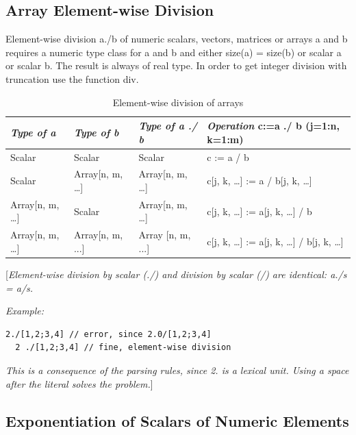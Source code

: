 \documentclass[10pt,a4paper]{report}
\def\doublelabel#1{\label{#1}\hypertarget{#1}{}}
\begin{document}
\subsection{Array Element-wise Division}\doublelabel{array-element-wise-division}

Element-wise division a./b of numeric scalars, vectors, matrices or
arrays a and b requires a numeric type class for a and b and either
size(a) = size(b) or scalar a or scalar b. The result is always of real
type. In order to get integer division with truncation use the function
div.

\begin{longtable}[]{|l|l|l|l|}
\caption{Element-wise division of arrays}\\
\hline
\endhead
\emph{Type of a} & \emph{Type of b} & \emph{Type of a ./ b} &
\emph{Operation} c:=a ./ b (j=1:n, k=1:m)\\ \hline
Scalar & Scalar & Scalar & c := a / b\\ \hline
Scalar & Array{[}n, m, \ldots{}{]} & Array{[}n, m, \ldots{}{]} & c{[}j,
k, \ldots{}{]} := a / b{[}j, k, \ldots{}{]}\\ \hline
Array{[}n, m, \ldots{}{]} & Scalar & Array{[}n, m, \ldots{}{]} & c{[}j,
k, \ldots{}{]} := a{[}j, k, \ldots{}{]} / b\\ \hline
Array{[}n, m, \ldots{}{]} & Array{[}n, m, ...{]} & Array {[}n, m, ...{]}
& c{[}j, k, \ldots{}{]} := a{[}j, k, \ldots{}{]} / b{[}j, k,
\ldots{}{]}\\ \hline

\end{longtable}

{[}\emph{Element-wise division by scalar (./) and division by scalar (/)
are identical: a./s = a/s.}

\emph{Example:}

\begin{lstlisting}[language=modelica]
  2./[1,2;3,4] // error, since 2.0/[1,2;3,4]
  2 ./[1,2;3,4] // fine, element-wise division
\end{lstlisting}
\emph{This is a consequence of the parsing rules, since 2. is a lexical
unit. Using a space after the literal solves the problem.}{]}

\subsection{Exponentiation of Scalars of Numeric Elements}\doublelabel{exponentiation-of-scalars-of-numeric-elements}
\end{document}

